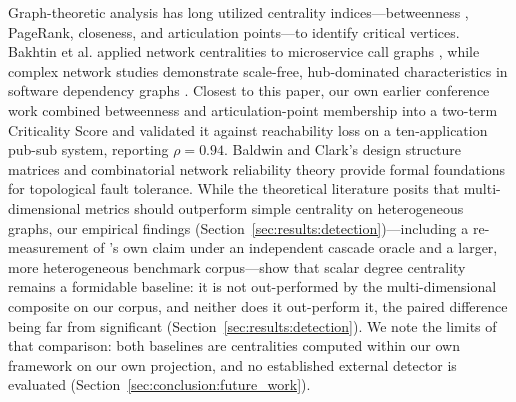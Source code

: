 Graph-theoretic analysis has long utilized centrality indices---betweenness \citep{freeman1977set}, PageRank, closeness, and articulation points---to identify critical vertices. Bakhtin et al. applied network centralities to microservice call graphs \citep{bakhtin2025network}, while complex network studies demonstrate scale-free, hub-dominated characteristics in software dependency graphs \citep{falci2018complex}. Closest to this paper, our own earlier conference work \citep{yigit2025graph} combined betweenness and articulation-point membership into a two-term Criticality Score and validated it against reachability loss on a ten-application pub-sub system, reporting $\rho = 0.94$. Baldwin and Clark's design structure matrices \citep{baldwin2000design} and combinatorial network reliability theory \citep{colbourn1987combinatorics} provide formal foundations for topological fault tolerance. While the theoretical literature posits that multi-dimensional metrics should outperform simple centrality on heterogeneous graphs, our empirical findings (Section~\ref{sec:results:detection})---including a re-measurement of \citet{yigit2025graph}'s own claim under an independent cascade oracle and a larger, more heterogeneous benchmark corpus---show that scalar degree centrality remains a formidable baseline: it is not out-performed by the multi-dimensional composite on our corpus, and neither does it out-perform it, the paired difference being far from significant (Section~\ref{sec:results:detection}). We note the limits of that comparison: both baselines are centralities computed within our own framework on our own projection, and no established external detector is evaluated (Section~\ref{sec:conclusion:future_work}).
